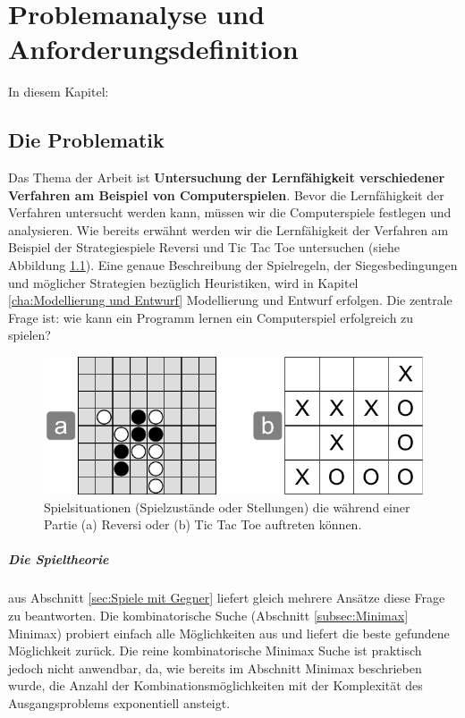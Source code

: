 \chapter{Problemanalyse und Anforderungsdefinition}
\label{cha:pua}

In diesem Kapitel: 

\section{Die Problematik}
Das Thema der Arbeit ist \textbf{Untersuchung der Lernfähigkeit verschiedener Verfahren am Beispiel von Computerspielen}. Bevor die Lernfähigkeit der Verfahren untersucht werden kann, müssen wir die Computerspiele festlegen und analysieren. Wie bereits erwähnt werden wir die Lernfähigkeit der Verfahren am Beispiel der Strategiespiele Reversi und Tic Tac Toe untersuchen (siehe Abbildung \ref{fig:reversi_und_tictactoe}). Eine genaue Beschreibung der Spielregeln, der Siegesbedingungen und möglicher Strategien bezüglich Heuristiken, wird in Kapitel \ref{cha:Modellierung und Entwurf} Modellierung und Entwurf erfolgen. Die zentrale Frage ist: wie kann ein Programm lernen ein Computerspiel erfolgreich zu spielen? \\

\begin{figure}[!htbp]
  \centering
  \includegraphics[scale = 0.8]{inhalt/abbildungen/reversi_und_tictactoe.pdf}
  \caption{Spielsituationen (Spielzustände oder Stellungen) die während einer Partie (a) Reversi oder (b) Tic Tac Toe auftreten können.}
  \label{fig:reversi_und_tictactoe}
\end{figure} 

\paragraph{Die Spieltheorie} aus Abschnitt \ref{sec:Spiele mit Gegner} liefert gleich mehrere Ansätze diese Frage zu beantworten. Die kombinatorische Suche (Abschnitt \ref{subsec:Minimax} Minimax) probiert einfach alle Möglichkeiten aus und liefert die beste gefundene Möglichkeit zurück. Die reine kombinatorische Minimax Suche ist praktisch jedoch nicht anwendbar, da, wie bereits im Abschnitt Minimax beschrieben wurde, die Anzahl der Kombinationsmöglichkeiten mit der Komplexität des Ausgangsproblems exponentiell ansteigt. \\

